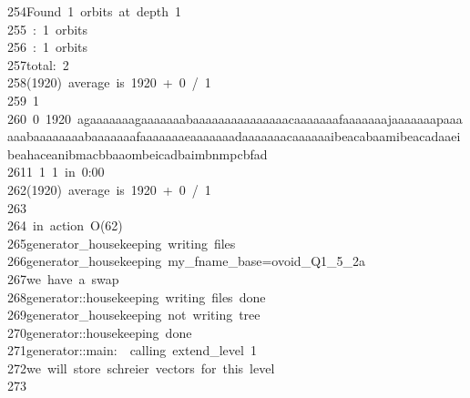 \begin{tabbing}
254\>Found\ 1\ orbits\ at\ depth\ 1\\[0pt]
255\ :\ 1\ orbits\\[0pt]
256\ :\ 1\ orbits\\[0pt]
257\>total:\ 2\\[0pt]
258\>(1920)\ average\ is\ 1920\ +\ 0\ /\ 1\\[0pt]
259\>\ 1\\[0pt]
260\ 0\ 1920\ agaaaaaaagaaaaaaabaaaaaaaaaaaaaaacaaaaaaafaaaaaaajaaaaaaapaaaaaabaaaaaaaabaaaaaaafaaaaaaaeaaaaaaadaaaaaaacaaaaaaibeacabaamibeacadaaeibeahaceanibmacbbaaombeicadbaimbnmpcbfad\\[0pt]
261\>1\ 1\ 1\ in\ 0:00\\[0pt]
262\>(1920)\ average\ is\ 1920\ +\ 0\ /\ 1\\[0pt]
263\>\\[0pt]
264\>\ in\ action\ O(62)\\[0pt]
265\>generator\_housekeeping\ writing\ files\\[0pt]
266\>generator\_housekeeping\ my\_fname\_base=ovoid\_Q1\_5\_2a\\[0pt]
267\>we\ have\ a\ swap\\[0pt]
268\>generator::housekeeping\ writing\ files\ done\\[0pt]
269\>generator\_housekeeping\ not\ writing\ tree\\[0pt]
270\>generator::housekeeping\ done\\[0pt]
271\>generator::main:\ \ calling\ extend\_level\ 1\\[0pt]
272\>we\ will\ store\ schreier\ vectors\ for\ this\ level\\[0pt]
273\>\\[0pt]

\end{tabbing}
